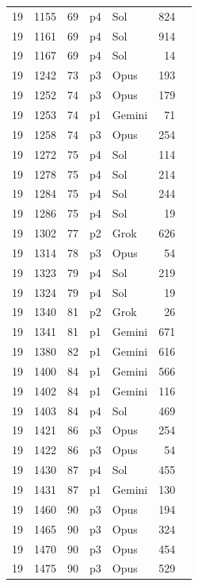 \begin{longtable}{r r r l l r L{2.3in}}
19 & 1155 & 69 & p4 & Sol & 824 &  \\
19 & 1161 & 69 & p4 & Sol & 914 &  \\
19 & 1167 & 69 & p4 & Sol & 14 &  \\
19 & 1242 & 73 & p3 & Opus & 193 &  \\
19 & 1252 & 74 & p3 & Opus & 179 &  \\
19 & 1253 & 74 & p1 & Gemini & 71 &  \\
19 & 1258 & 74 & p3 & Opus & 254 &  \\
19 & 1272 & 75 & p4 & Sol & 114 &  \\
19 & 1278 & 75 & p4 & Sol & 214 &  \\
19 & 1284 & 75 & p4 & Sol & 244 &  \\
19 & 1286 & 75 & p4 & Sol & 19 &  \\
19 & 1302 & 77 & p2 & Grok & 626 &  \\
19 & 1314 & 78 & p3 & Opus & 54 &  \\
19 & 1323 & 79 & p4 & Sol & 219 &  \\
19 & 1324 & 79 & p4 & Sol & 19 &  \\
19 & 1340 & 81 & p2 & Grok & 26 &  \\
19 & 1341 & 81 & p1 & Gemini & 671 &  \\
19 & 1380 & 82 & p1 & Gemini & 616 &  \\
19 & 1400 & 84 & p1 & Gemini & 566 &  \\
19 & 1402 & 84 & p1 & Gemini & 116 &  \\
19 & 1403 & 84 & p4 & Sol & 469 &  \\
19 & 1421 & 86 & p3 & Opus & 254 &  \\
19 & 1422 & 86 & p3 & Opus & 54 &  \\
19 & 1430 & 87 & p4 & Sol & 455 &  \\
19 & 1431 & 87 & p1 & Gemini & 130 &  \\
19 & 1460 & 90 & p3 & Opus & 194 &  \\
19 & 1465 & 90 & p3 & Opus & 324 &  \\
19 & 1470 & 90 & p3 & Opus & 454 &  \\
19 & 1475 & 90 & p3 & Opus & 529 &  \\

\end{longtable}

